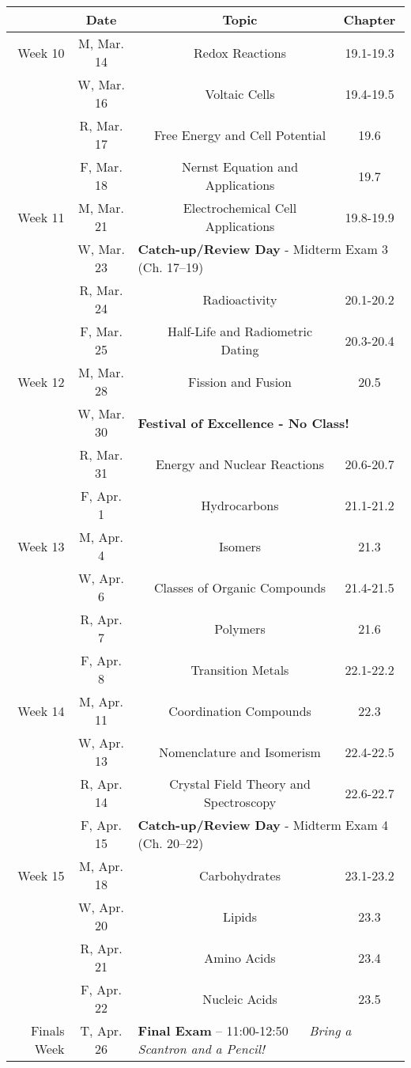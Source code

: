 \documentclass[12pt, letterpaper]{article}
\begin{document}
\begin{tabular}{rcccc}
	& Date && Topic & Chapter\\	
	\midrule
	Week 10 & M, Mar. 14&& Redox Reactions & 19.1-19.3\\
	& W, Mar. 16&& Voltaic Cells & 19.4-19.5\\
	& R, Mar. 17&& Free Energy and Cell Potential & 19.6\\
	& F, Mar. 18&& Nernst Equation and Applications & 19.7\\
	\midrule
	Week 11 & M, Mar. 21&& Electrochemical Cell Applications & 19.8-19.9\\
	& W, Mar. 23& \multicolumn{3}{l}{\textbf{Catch-up/Review Day} - Midterm Exam 3 (Ch. 17--19)}\\
	& R, Mar. 24&& Radioactivity & 20.1-20.2\\
	& F, Mar. 25&& Half-Life and Radiometric Dating & 20.3-20.4\\
	\midrule
	Week 12 & M, Mar. 28&& Fission and Fusion & 20.5\\
	& W, Mar. 30& \multicolumn{3}{l}{\textbf{Festival of Excellence - No Class!}}\\
	& R, Mar. 31&& Energy and Nuclear Reactions & 20.6-20.7\\
	& F, Apr. 1&& Hydrocarbons & 21.1-21.2\\
	\midrule
	Week 13 & M, Apr. 4&& Isomers & 21.3\\
	& W, Apr. 6&& Classes of Organic Compounds & 21.4-21.5\\
	& R, Apr. 7&& Polymers & 21.6\\
	& F, Apr. 8&& Transition Metals & 22.1-22.2\\
	\midrule
	Week 14 & M, Apr. 11&& Coordination Compounds & 22.3\\
	& W, Apr. 13&& Nomenclature and Isomerism & 22.4-22.5\\
	& R, Apr. 14&& Crystal Field Theory and Spectroscopy & 22.6-22.7\\
	& F, Apr. 15& \multicolumn{3}{l}{\textbf{Catch-up/Review Day} - Midterm Exam 4 (Ch. 20--22)}\\
	\midrule
	Week 15 & M, Apr. 18&& Carbohydrates & 23.1-23.2\\
	& W, Apr. 20&& Lipids & 23.3\\
	& R, Apr. 21&& Amino Acids & 23.4\\
	& F, Apr. 22&& Nucleic Acids & 23.5\\
	\midrule
	\midrule
	Finals Week & T, Apr. 26& \multicolumn{3}{l}{\textbf{Final Exam} -- 11:00-12:50 ~~ \emph{Bring a Scantron and a Pencil!}}\\
\end{tabular}
\end{document}
